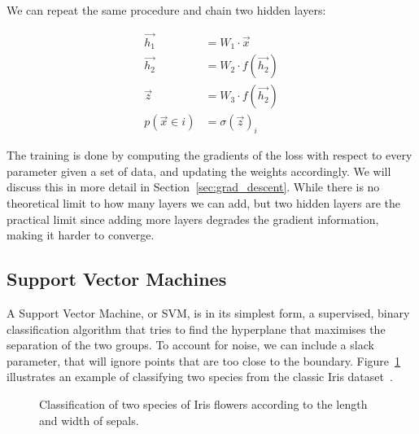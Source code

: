We can repeat the same procedure  and chain two hidden layers:

\begin{align*}
\vec{h_1} &= W_1 \cdot \vec{x} \\
\vec{h_2} &= W_2 \cdot f(\vec{h_2}) \\
\vec{z} &= W_3 \cdot f(\vec{h_2}) \\
p(\vec x \in i) &= \sigma(\vec z)_i
\end{align*}

The training is done by computing the gradients of the loss with respect to every parameter given a set of data, and updating the weights accordingly.
We will discuss this in more detail in Section~\ref{sec:grad_descent}.
While there is no theoretical limit to how many layers we can add, but two hidden layers are the practical limit since adding more layers degrades the gradient information, making it harder to converge.


\subsection{Support Vector Machines}
A Support Vector Machine, or SVM, is in its simplest form, a supervised, binary classification algorithm that tries to find the hyperplane that maximises the separation of the two groups.
To account for noise, we can include a slack parameter, that will ignore points that are too close to the boundary.
Figure~\ref{fig:svm} illustrates an example of classifying two species from the classic Iris dataset~\citep{iris_dataset}.


\begin{figure}
\centering
{}%
\hfill
{}%
\caption{Classification of two species of Iris flowers according to the length and width of sepals.}\label{fig:svm}
\end{figure}

